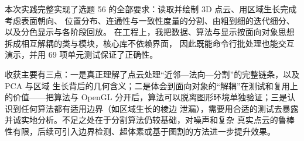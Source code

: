 本次实践完整实现了选题 56 的全部要求：读取并绘制 3D 点云、用区域生长完成考虑表面朝向、
位置分布、连通性与一致性度量的分割、由粗到细的迭代细分、以及分色显示与各阶段回放。
在工程上，我把数据、算法与显示按面向对象思想拆成相互解耦的类与模块，核心库不依赖界面，
因此既能命令行批处理也能交互演示，并用 69 项单元测试保证了正确性。

收获主要有三点：一是真正理解了点云处理“近邻—法向—分割”的完整链条，以及 PCA 与区域
生长背后的几何含义；二是体会到面向对象的“解耦”在测试和复用上的价值——把算法与 OpenGL
分开后，算法可以脱离图形环境单独验证；三是认识到任何算法都有适用边界（如区域生长的棱边
泄漏），需要用合适的测试去暴露并诚实地分析。不足之处在于分割算法仍较基础，对噪声和复杂
真实点云的鲁棒性有限，后续可引入边界检测、超体素或基于图割的方法进一步提升效果。
